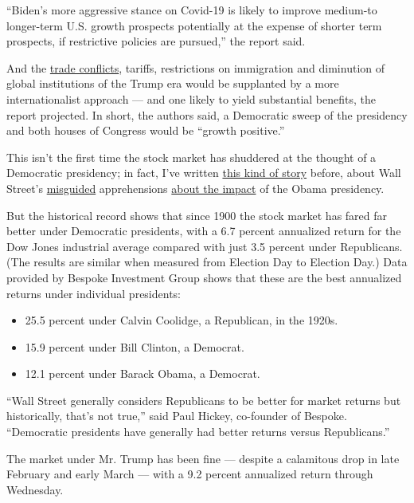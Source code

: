 ``Biden's more aggressive stance on Covid-19 is likely to improve
medium-to longer-term U.S. growth prospects potentially at the expense
of shorter term prospects, if restrictive policies are pursued,'' the
report said.

And the
\href{https://www.nytimes.com/2018/09/21/business/trade-disputes-more-than-a-money-problem.html}{trade
conflicts}, tariffs, restrictions on immigration and diminution of
global institutions of the Trump era would be supplanted by a more
internationalist approach --- and one likely to yield substantial
benefits, the report projected. In short, the authors said, a Democratic
sweep of the presidency and both houses of Congress would be ``growth
positive.''

This isn't the first time the stock market has shuddered at the thought
of a Democratic presidency; in fact, I've written
\href{https://www.nytimes.com/2012/10/21/your-money/wall-st-may-not-cheer-but-obamas-been-good-for-stocks.html}{this
kind of story} before, about Wall Street's
\href{https://www.nytimes.com/2016/08/21/your-money/the-obama-years-the-best-of-times-to-be-a-stock-investor.html}{misguided}
apprehensions
\href{https://www.nytimes.com/2013/08/11/your-money/this-ironman-market-is-still-lacking-respect.html}{about
the impact} of the Obama presidency.

But the historical record shows that since 1900 the stock market has
fared far better under Democratic presidents, with a 6.7 percent
annualized return for the Dow Jones industrial average compared with
just 3.5 percent under Republicans. (The results are similar when
measured from Election Day to Election Day.) Data provided by Bespoke
Investment Group shows that these are the best annualized returns under
individual presidents:

\begin{itemize}
\item
  25.5 percent under Calvin Coolidge, a Republican, in the 1920s.
\item
  15.9 percent under Bill Clinton, a Democrat.
\item
  12.1 percent under Barack Obama, a Democrat.
\end{itemize}

``Wall Street generally considers Republicans to be better for market
returns but historically, that's not true,'' said Paul Hickey,
co-founder of Bespoke. ``Democratic presidents have generally had better
returns versus Republicans.''

The market under Mr. Trump has been fine --- despite a calamitous drop
in late February and early March --- with a 9.2 percent annualized
return through Wednesday.

